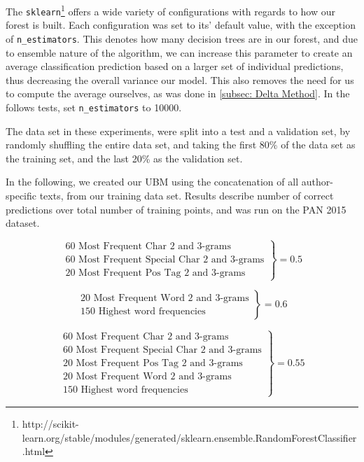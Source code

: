 The \texttt{sklearn}\footnote{http://scikit-learn.org/stable/modules/generated/sklearn.ensemble.RandomForestClassifier.html} offers a wide variety of configurations with regards to how our forest is built. Each configuration was set to its' default value, with the exception of \texttt{n\_estimators}. This denotes how many decision trees are in our forest, and due to ensemble nature of the algorithm, we can increase this parameter to create an average classification prediction based on a larger set of individual predictions, thus decreasing the overall variance our model. This also removes the need for us to compute the average ourselves, as was done in \ref{subsec: Delta Method}. In the follows tests, set \texttt{n\_estimators} to 10000.

The data set in these experiments, were split into a test and a validation set, by randomly shuffling the entire data set, and taking the first 80\% of the data set as the training set, and the last 20\% as the validation set.

In the following, we created our \gls{UBM} using the concatenation of all author-specific texts, from our training data set. Results describe number of correct predictions over total number of training points, and was run on the PAN 2015 dataset. 

$$
\left.
                \begin{array}{ll}
                  \text{60 Most Frequent Char 2 and 3-grams}\\
                  \text{60 Most Frequent Special Char 2 and 3-grams}\\
                  \text{20 Most Frequent Pos Tag 2 and 3-grams}
                \end{array}
              \right\rbrace = 0.5
$$

$$
\left.
                \begin{array}{ll}
                  \text{20 Most Frequent Word 2 and 3-grams}\\
                  \text{150 Highest word frequencies}
                \end{array}
              \right\rbrace = 0.6
$$

$$
\left.
                \begin{array}{ll}
                  \text{60 Most Frequent Char 2 and 3-grams}\\
                  \text{60 Most Frequent Special Char 2 and 3-grams}\\
                  \text{20 Most Frequent Pos Tag 2 and 3-grams}\\
                  \text{20 Most Frequent Word 2 and 3-grams}\\
                  \text{150 Highest word frequencies}
                \end{array}
              \right\rbrace = 0.55
$$

